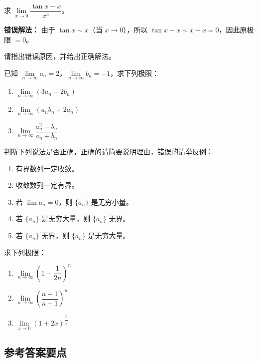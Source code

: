 \documentclass{ctexart}
\begin{document}
\begin{example}[加减结构中的错误示例]
\begin{exercise}
求 \(\lim\limits_{x\to 0} \dfrac{\tan x - x}{x^3}\)。

\textbf{错误解法：}
由于 \(\tan x \sim x\)（当 \(x \to 0\)），所以 \(\tan x - x \sim x - x = 0\)，因此原极限 \(= 0\)。

请指出错误原因，并给出正确解法。
\end{exercise}

\begin{exercise}已知 \(\lim\limits_{n\to\infty} a_n = 2\)，\(\lim\limits_{n\to\infty} b_n = -1\)，求下列极限：
\begin{enumerate}
\item \(\lim\limits_{n\to\infty} (3a_n - 2b_n)\)
\item \(\lim\limits_{n\to\infty} (a_n b_n + 2a_n)\)
\item \(\lim\limits_{n\to\infty} \dfrac{a_n^2 - b_n}{a_n + b_n}\)
\end{enumerate}
\end{exercise}

\begin{exercise}判断下列说法是否正确，正确的请简要说明理由，错误的请举反例：
\begin{enumerate}
\item 有界数列一定收敛。
\item 收敛数列一定有界。
\item 若 \(\lim a_n = 0\)，则 \(\{a_n\}\) 是无穷小量。
\item 若 \(\{a_n\}\) 是无穷大量，则 \(\{a_n\}\) 无界。
\item 若 \(\{a_n\}\) 无界，则 \(\{a_n\}\) 是无穷大量。
\end{enumerate}
\end{exercise}

\begin{exercise}求下列极限：
\begin{enumerate}
\item \(\lim\limits_{n\to\infty} \left(1 + \dfrac{1}{2n}\right)^n\)
\item \(\lim\limits_{n\to\infty} \left(\dfrac{n+1}{n-1}\right)^n\)
\item \(\lim\limits_{x\to 0} (1 + 2x)^{\dfrac{1}{x}}\)
\end{enumerate}
\end{exercise}

\clearpage

\subsection*{参考答案要点}


\end{example}
\end{document}
